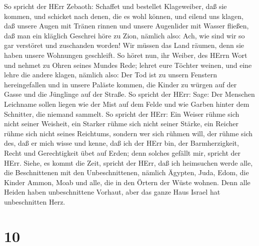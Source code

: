 So spricht der HErr Zebaoth: Schaffet und bestellet Klageweiber, daß sie
kommen, und schicket nach denen, die es wohl können,  und
eilend uns klagen, daß unsere Augen mit Tränen rinnen und unsere
Augenlider mit Wasser fließen,  daß man ein kläglich
Geschrei höre zu Zion, nämlich also: Ach, wie sind wir so gar verstöret
und zuschanden worden! Wir müssen das Land räumen, denn sie haben unsere
Wohnungen geschleift.  So höret nun, ihr Weiber, des HErrn
Wort und nehmet zu Ohren seines Mundes Rede; lehret eure Töchter weinen,
und eine lehre die andere klagen, nämlich also:  Der Tod
ist zu unsern Fenstern hereingefallen und in unsere Paläste kommen, die
Kinder zu würgen auf der Gasse und die Jünglinge auf der Straße.
 So spricht der HErr: Sage: Der Menschen Leichname sollen
liegen wie der Mist auf dem Felde und wie Garben hinter dem Schnitter,
die niemand sammelt.  So spricht der HErr: Ein Weiser rühme
sich nicht seiner Weisheit, ein Starker rühme sich nicht seiner Stärke,
ein Reicher rühme sich nicht seines Reichtums,  sondern wer
sich rühmen will, der rühme sich des, daß er mich wisse und kenne, daß
ich der HErr bin, der Barmherzigkeit, Recht und Gerechtigkeit übet auf
Erden; denn solches gefällt mir, spricht der HErr.  Siehe,
es kommt die Zeit, spricht der HErr, daß ich heimsuchen werde alle, die
Beschnittenen mit den Unbeschnittenen,  nämlich Ägypten,
Juda, Edom, die Kinder Ammon, Moab und alle, die in den Örtern der Wüste
wohnen. Denn alle Heiden haben unbeschnittene Vorhaut, aber das ganze
Haus Israel hat unbeschnitten Herz.

\hypertarget{section-9}{%
\section{10}\label{section-9}}

